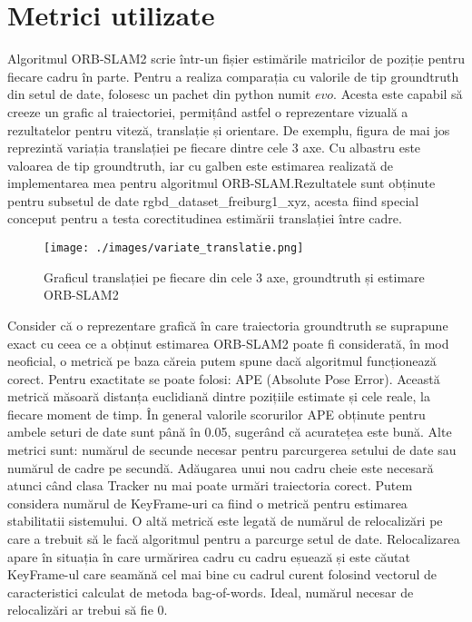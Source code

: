 \documentclass[12pt,a4paper]{report}
\begin{document}
\section{Metrici utilizate}
Algoritmul ORB-SLAM2 scrie într-un fișier estimările matricilor de poziție pentru fiecare 
cadru în parte. Pentru a realiza comparația cu valorile de tip groundtruth din setul de 
date, folosesc un pachet din python numit $ evo $. Acesta este capabil să creeze un grafic
al traiectoriei, permițând astfel o reprezentare vizuală a rezultatelor pentru viteză, 
translație și orientare. De exemplu, figura de mai jos reprezintă variația translației pe 
fiecare dintre cele 3 axe. Cu albastru este valoarea de tip groundtruth, iar cu galben este
estimarea realizată de implementarea mea pentru algoritmul ORB-SLAM.\@ Rezultatele sunt
obținute pentru subsetul de date rgbd\_dataset\_freiburg1\_xyz, acesta fiind special
conceput pentru a testa corectitudinea estimării translației între cadre.
\begin{figure}[htbp] 
  \centering
  \texttt{[image: ./images/variate\_translatie.png]}
  \caption{Graficul translației pe fiecare din cele 3 axe, groundtruth și estimare ORB-SLAM2}\label{fig:translatie}
\end{figure}
Consider că o reprezentare grafică în care traiectoria groundtruth se suprapune exact cu
ceea ce a obținut estimarea ORB-SLAM2 poate fi considerată, în mod neoficial, o metrică
pe baza căreia putem spune dacă algoritmul funcționează corect. Pentru exactitate 
se poate folosi: APE (Absolute Pose Error). Această metrică măsoară distanța euclidiană 
dintre pozițiile estimate și cele reale, la fiecare moment de timp.
În general valorile scorurilor APE obținute pentru ambele seturi de date sunt până în 0.05,
sugerând că acuratețea este bună. Alte metrici sunt: numărul de secunde necesar pentru 
parcurgerea setului de date sau numărul de cadre pe secundă. Adăugarea unui nou cadru cheie este necesară 
atunci când clasa Tracker nu mai poate urmări traiectoria corect. Putem considera numărul de KeyFrame-uri 
ca fiind o metrică pentru estimarea stabilitatii sistemului. O altă metrică este 
legată de numărul de relocalizări pe care a trebuit să le facă algoritmul pentru a parcurge 
setul de date. Relocalizarea apare în situația în care urmărirea cadru cu cadru eșuează și 
este căutat KeyFrame-ul care seamănă cel mai bine cu cadrul curent folosind vectorul de caracteristici
calculat de metoda bag-of-words. Ideal, numărul necesar de relocalizări ar trebui să fie 0.\\
\end{document}
